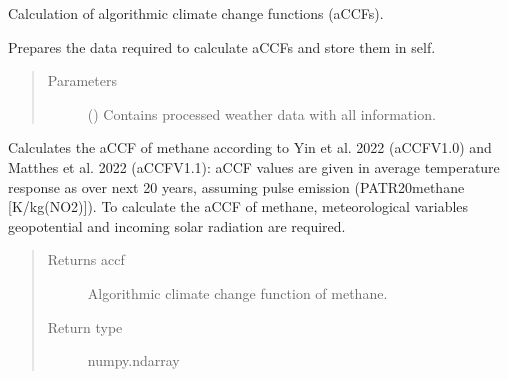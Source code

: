 \documentclass[a4paper,11pt,english]{sphinxmanual}
\begin{document}
\begin{fulllineitems}
\label{\detokenize{modules:envlib.accf.GeTaCCFs}}
Calculation of algorithmic climate change functions (aCCFs).

\begin{fulllineitems}
\label{\detokenize{modules:envlib.accf.GeTaCCFs.__init__}}
Prepares the data required to calculate aCCFs and store them in self.
\begin{quote}\begin{description}
\item[{Parameters}] \leavevmode
{} () \textendash{} Contains processed weather data with all information.

\end{description}\end{quote}

\end{fulllineitems}


\begin{fulllineitems}
\label{\detokenize{modules:envlib.accf.GeTaCCFs.accf_ch4}}
Calculates the aCCF of methane according to Yin et al. 2022 (aCCF\sphinxhyphen{}V1.0) and Matthes et al. 2022 (aCCF\sphinxhyphen{}V1.1): aCCF values are  given in average 
temperature response as over next 20 years, assuming pulse emission (P\sphinxhyphen{}ATR20\sphinxhyphen{}methane {[}K/kg(NO2){]}). To calculate the aCCF of methane, meteorological
variables geopotential and incoming solar radiation are required.
\begin{quote}\begin{description}
\item[{Returns accf}] \leavevmode
Algorithmic climate change function of methane.

\item[{Return type}] \leavevmode
numpy.ndarray


\end{description}
\end{quote}
\end{fulllineitems}
\end{fulllineitems}
\end{document}
